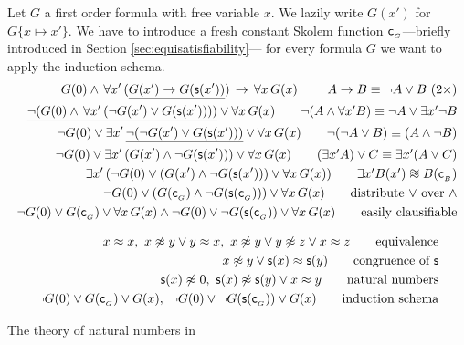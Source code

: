 \begin{example} Let \( G \) a first order formula with free variable \( x \).
	We lazily write \( G(x') \) for \( G\{x\mapsto x'\} \).
	We have to introduce a fresh constant Skolem function \( \mathsf{c}_{_G} \)---briefly introduced 
	in Section \ref{sec:equisatisfiability}---
	for every formula \( G \) we want to apply the induction schema.
	\begin{align*}
		{		
			G(0) \land \, \forall x'\,
		(\underline{G(x') \limp G(\msucc(x'))})
		\, \limp \, 
		\forall x \, G(x)
		} 
		\tag*{   \( A \limp B \equiv \lnot A \lor B \ (2\times)\)}
\\
\underline{\lnot(
G(0) \land \, \forall x'\,
(\lnot G(x') \lor G(\msucc(x')))
)} \lor 
\forall x \, G(x) 
\tag*{\( \lnot(A\land \forall x' B) \equiv \lnot A\lor \exists x' \lnot B \)}
\\
\lnot G(0) \lor \exists x'\, 
\underline{\lnot(\lnot G(x') \lor G(\msucc(x')))}
\lor 
\forall x \, G(x)
\tag*{\( \lnot(\lnot A \lor B) \equiv (A \land \lnot B) \)}
\\
\lnot G(0) \lor 
\exists x'\,(G(x') \land \lnot G(\msucc(x')))
\lor 
\forall x \, G(x)
\tag*{\( (\exists x' A) \lor C \equiv \exists x' (A \lor C) \)}
\\
\exists x'\,(
\lnot G(0) \lor 
(G(x') \land \lnot G(\msucc(x')))
\lor 
\forall x \, G(x)
)
\tag*{\( \exists x' B(x') \equisat B(\mc_{_B}) \)}
\\
\lnot G(0) \lor 
(G(\mc_{_G}) \land \lnot G(\msucc(\mc_{_G}))) 
\lor 
\forall x \, G(x)
\tag*{distribute \(\lor\) over \(\land\)}
\\
{\lnot G(0) \lor 
G(\mc_{_G})
\lor 
\forall x \, G(x)}
\land
{\lnot G(0) \lor 
\lnot G(\msucc(\mc_{_G}))
\lor 
\forall x \, G(x)}
\tag*{easily clausifiable}
\end{align*}
\end{example}

\begin{table}[hbt]
	\begin{align*}
	x\mEQ x,\
	x\mNE y\lor y\mEQ x,\
	x\mNE y\lor y\mNE z\lor x\mEQ z
	\tag*{equivalence}
	\\
	x\mNE y\lor \msucc(x)\mEQ\msucc(y)
	\tag*{congruence of \( \msucc \)}
	\\
	\msucc(x) \mNE 0,\
	\msucc(x) \mNE \msucc(y) \lor x \mEQ y
	\tag*{natural numbers}
	\\
	\lnot G(0) \lor {G(\mc_{_G})} \lor G(x),\
	\lnot G(0) \lor {\lnot G(\msucc(\mc_{_G}))} \lor G(x)
	\tag*{induction schema}
	\end{align*}
	\caption{The theory of natural numbers in \CNF}\label{tab:natural:numbers}
\end{table}

